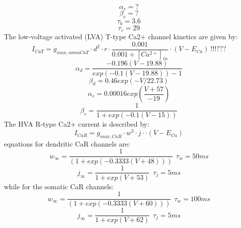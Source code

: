 \documentclass[12pt]{article}
\begin{document}
\begin{equation}
\alpha_{c} = ?
\end{equation}
\begin{equation}
\beta_{c} = ?
\end{equation}
\begin{equation}
\tau_{b} = 3.6
\end{equation}
\begin{equation}
\tau_{c} = 29
\end{equation}
\newline
The low-voltage activated (LVA) T-type Ca2+ channel kinetics are given by:
\begin{equation}
I_{CaT} = g_{max, soma CaT} \cdot d^2 \cdot r \cdot \frac{0.001}{0.001 + [Ca^{2+}]_{in}} \cdot (V - E_{Ca}) \ !!!???
\end{equation}
\begin{equation}
\alpha_{d} = \frac{-0.196(V - 19.88)}{ exp(-0.1(V - 19.88)) - 1}
\end{equation}
\begin{equation}
\beta_{d} = 0.46 exp( -V/22.73 ) 
\end{equation}
\begin{equation}
\alpha_{r} = 0.00016 exp( \frac{V+57}{-19})
\end{equation}
\begin{equation}
\beta_{r} = \frac{1}{1 + exp(-0.1(V-15)) }
\end{equation}
\newline
The HVA R-type Ca2+ current is described by:
\begin{equation}
I_{CaR} = g_{max, CaR} \cdot w^3 \cdot j \cdot  \cdot (V - E_{Ca}) 
\end{equation}
equations for dendritic CaR channels are:
\begin{equation}
w_{\infty} = \frac{1}{ (1 + exp(-0.3333(V+48)) ) } \ \ \tau_{w} = 50 ms
\end{equation}
\begin{equation}
j_{\infty} = \frac{1}{1 + exp(V + 53) } \ \ \tau_{j} = 5 ms
\end{equation}
while for the somatic CaR channels:
\begin{equation}
w_{\infty} = \frac{1}{ (1 + exp(-0.3333(V+60)) ) } \ \ \tau_{w} = 100 ms
\end{equation}
\begin{equation}
j_{\infty} = \frac{1}{1 + exp(V + 62) } \ \ \tau_{j} = 5 ms
\end{equation}
\newline
\end{document}
